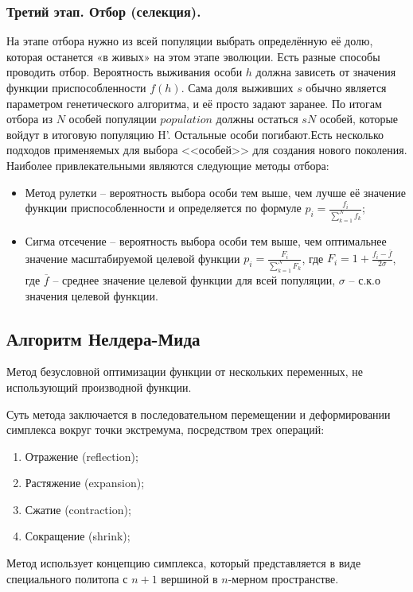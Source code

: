\subsubsection{Третий этап. Отбор (селекция).}
\noindent\indent На этапе отбора нужно из всей популяции выбрать определённую её
долю, которая останется «в живых» на этом этапе эволюции. Есть разные способы
проводить отбор. Вероятность выживания особи $h$ должна зависеть от значения функции
приспособленности $f(h)$. Сама доля выживших $s$ обычно является параметром
генетического алгоритма, и её просто задают заранее. По итогам отбора из $N$ особей
популяции $population$ должны остаться $sN$ особей, которые войдут в итоговую популяцию H'.
Остальные особи погибают.Есть несколько подходов применяемых для выбора <<особей>>
для создания нового поколения. Наиболее привлекательными являются следующие методы
отбора:
  \begin{itemize}
    \item Метод рулетки -- вероятность выбора особи тем выше, чем лучше её значение
функции приспособленности и определяется по формуле $p_i = \frac{f_i}{\sum\limits_{k=1}^{N}f_k}$;
    \item Сигма отсечение -- вероятность выбора особи тем выше, чем оптимальнее
значение масштабируемой целевой функции $p_i = \frac{F_i}{\sum\limits_{k=1}^{N}F_k}$,
где $F_i = 1 + \frac{f_i - \overline{f}}{2\sigma}$, где $\overline{f}$ -- среднее
значение целевой функции для всей популяции, $\sigma$ -- с.к.о значения целевой функции.
  \end{itemize}
\subsection{Алгоритм Нелдера-Мида}
\noindent\indent Метод безусловной оптимизации функции от нескольких переменных,
не использующий производной функции.\par
  Суть метода заключается в последовательном перемещении и деформировании симплекса
вокруг точки экстремума, посредством трех операций:\par
\begin{enumerate}
  \item Отражение (reflection);
  \item Растяжение (expansion);
  \item Сжатие (contraction);
  \item Сокращение (shrink);
\end{enumerate}
  Метод использует концепцию симплекса, который представляется в виде специального
политопа с $n+1$ вершиной в $n$-мерном пространстве.\par
